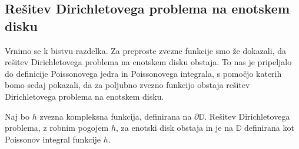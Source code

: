 \documentclass[mat1, tisk]{fmfdelo}
\begin{document}
\subsection{Rešitev Dirichletovega problema na enotskem disku}
    Vrnimo se k bistvu razdelka. Za preproste zvezne funkcije smo že dokazali, da rešitev Dirichletovega problema na enotskem disku obstaja. To nas je pripeljalo do definicije Poissonovega jedra in Poissonovega integrala, s pomočjo katerih bomo sedaj pokazali, da za poljubno zvezno funkcijo obstaja rešitev Dirichletovega problema na enotskem disku.
    \begin{trditev}
        \label{obstoj}
        Naj bo $h$ zvezna kompleksna funkcija, definirana na $\partial \mathbb{D}$. Rešitev Dirichletovega problema, z robnim pogojem $h$, za enotski disk obstaja in je na $\mathbb{D}$ definirana kot Poissonov integral funkcije $h$.
    \end{trditev}
\end{document}
